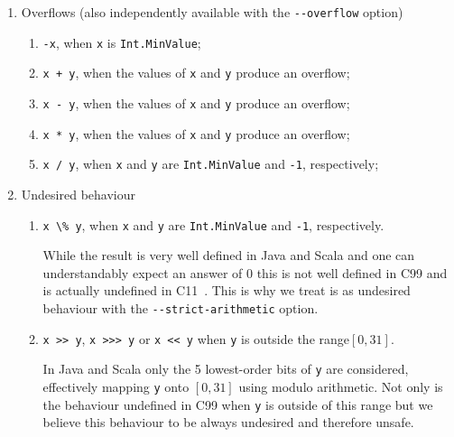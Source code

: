 \documentclass[a4paper,twoside]{article}
\newcommand{\Inline}[1]{\lstinline[basicstyle=\ttfamily]|#1|}
\newcommand{\InlineS}[1]{\lstinline[language=Leon]|#1|}
\begin{document}
\pagebreak[4]
\begin{enumerate}

\item Overflows (also independently available with the \Inline{--overflow} option)

  \begin{enumerate}

  \item \InlineS{-x}, when \InlineS{x} is \InlineS{Int.MinValue};

  \item \InlineS{x + y}, when the values of \InlineS{x} and \InlineS{y} produce
  an overflow;

  \item \InlineS{x - y}, when the values of \InlineS{x} and \InlineS{y} produce
  an overflow;

  \item \InlineS{x * y}, when the values of \InlineS{x} and \InlineS{y} produce
  an overflow;

  \item \InlineS{x / y}, when \InlineS{x} and \InlineS{y} are
  \InlineS{Int.MinValue} and \InlineS{-1}, respectively;

  \end{enumerate}

\item Undesired behaviour

  \begin{enumerate}

  \item \InlineS{x \% y}, when \InlineS{x} and \InlineS{y} are
  \InlineS{Int.MinValue} and \InlineS{-1}, respectively.

  While the result is very well defined in Java and Scala and one can
  understandably expect an answer of 0 this is not well defined in C99 and is
  actually undefined in C11~\cite{regehr}. This is why we treat is as undesired
  behaviour with the \Inline{--strict-arithmetic} option.

  \item \InlineS{x >> y}, \InlineS{x >>> y} or \InlineS{x << y} when \InlineS{y}
  is outside the range$[0,31]$.

  In Java and Scala only the 5 lowest-order bits of \InlineS{y} are considered,
  effectively mapping \InlineS{y} onto $[0,31]$ using modulo arithmetic. Not
  only is the behaviour undefined in C99 when \InlineS{y} is outside of this
  range but we believe this behaviour to be always undesired and therefore
  unsafe.

  \end{enumerate}
\end{enumerate}
\end{document}
